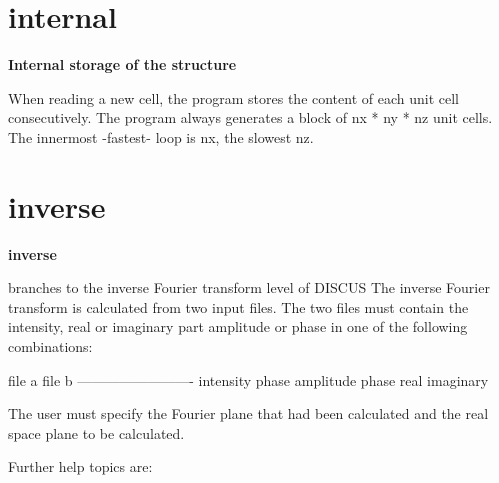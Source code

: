 \section{internal}
{\bf Internal storage of the structure \par }
\par
\vspace{3pt}
When reading a new cell, the program stores the content of each 
unit cell consecutively. The program always generates a block of 
nx * ny * nz unit cells. The innermost -fastest- loop is nx, the 
slowest nz. 
\section{inverse}
{\bf inverse \par }
\par
\vspace{3pt}
branches to the inverse Fourier transform level of DISCUS 
The inverse Fourier transform is calculated from two input files. 
The two files must contain the intensity, real or imaginary part 
amplitude or phase in one of the following combinations: 
\par
\begin{MacVerbatim}
file a          file b
-------------------------
intensity       phase
amplitude       phase
real            imaginary
\end{MacVerbatim}
The user must specify the Fourier plane that had been calculated 
and the real space plane to be calculated. 
\par
Further help topics are: 
\par
